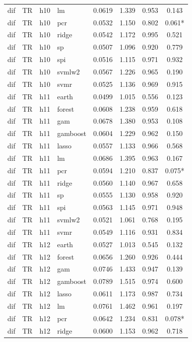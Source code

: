 \begin{ThreePartTable}
\begin{longtable}[t]{llclcccc}
dif & TR & h10 & lm & 0.0619 & 1.339 & 0.953 & 0.143\\
dif & TR & h10 & pcr & 0.0532 & 1.150 & 0.802 & 0.061*\\
dif & TR & h10 & ridge & 0.0542 & 1.172 & 0.995 & 0.521\\
dif & TR & h10 & sp & 0.0507 & 1.096 & 0.920 & 0.779\\
dif & TR & h10 & spi & 0.0516 & 1.115 & 0.971 & 0.932\\
dif & TR & h10 & svmlw2 & 0.0567 & 1.226 & 0.965 & 0.190\\
dif & TR & h10 & svmr & 0.0525 & 1.136 & 0.969 & 0.915\\
\addlinespace
dif & TR & h11 & earth & 0.0499 & 1.015 & 0.556 & 0.123\\
dif & TR & h11 & forest & 0.0608 & 1.238 & 0.959 & 0.618\\
dif & TR & h11 & gam & 0.0678 & 1.380 & 0.953 & 0.108\\
dif & TR & h11 & gamboost & 0.0604 & 1.229 & 0.962 & 0.150\\
dif & TR & h11 & lasso & 0.0557 & 1.133 & 0.966 & 0.568\\
dif & TR & h11 & lm & 0.0686 & 1.395 & 0.963 & 0.167\\
dif & TR & h11 & pcr & 0.0594 & 1.210 & 0.837 & 0.075*\\
dif & TR & h11 & ridge & 0.0560 & 1.140 & 0.967 & 0.658\\
dif & TR & h11 & sp & 0.0555 & 1.130 & 0.958 & 0.920\\
dif & TR & h11 & spi & 0.0563 & 1.145 & 0.971 & 0.948\\
dif & TR & h11 & svmlw2 & 0.0521 & 1.061 & 0.768 & 0.195\\
dif & TR & h11 & svmr & 0.0549 & 1.116 & 0.931 & 0.834\\
\addlinespace
dif & TR & h12 & earth & 0.0527 & 1.013 & 0.545 & 0.132\\
dif & TR & h12 & forest & 0.0656 & 1.260 & 0.926 & 0.444\\
dif & TR & h12 & gam & 0.0746 & 1.433 & 0.947 & 0.139\\
dif & TR & h12 & gamboost & 0.0789 & 1.515 & 0.974 & 0.600\\
dif & TR & h12 & lasso & 0.0611 & 1.173 & 0.987 & 0.734\\
dif & TR & h12 & lm & 0.0761 & 1.462 & 0.961 & 0.197\\
dif & TR & h12 & pcr & 0.0642 & 1.234 & 0.831 & 0.078*\\
dif & TR & h12 & ridge & 0.0600 & 1.153 & 0.962 & 0.718\\

\end{longtable}
\end{ThreePartTable}

